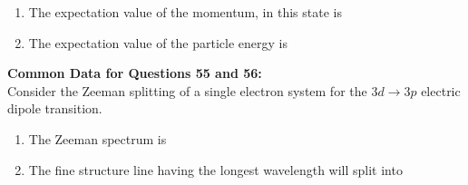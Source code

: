 \documentclass[14pt, a4paper]{extarticle}
\begin{document}
\begin{enumerate}[label=\textbf{Q. \arabic*}, start=53]

\item The expectation value of the momentum, in this state is
\begin{enumerate}
\end{enumerate}

\item The expectation value of the particle energy is
\begin{enumerate}
\end{enumerate}

\end{enumerate}

\vspace{1.5em}
\noindent
\textbf{Common Data for Questions 55 and 56:} \\
Consider the Zeeman splitting of a single electron system for the $3d \rightarrow 3p$ electric dipole transition.

\begin{enumerate}[label=\textbf{Q. \arabic*}, start=55]

\item The Zeeman spectrum is
\begin{enumerate}
\end{enumerate}

\item The fine structure line having the longest wavelength will split into
\begin{enumerate}
\end{enumerate}

\end{enumerate}
\end{document}
